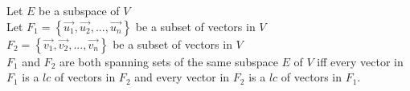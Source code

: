 \documentclass[12pt]{article}
\renewcommand{\v}[1]{\overrightarrow{#1}}
\newcommand{\bb}[1]{\left\{#1\right\}}
\begin{document}
	
	Let $E$ be a subspace of $V$ \\
	Let $F_1 = \bb{\v{u_1}, \v{u_2}, ..., \v{u_n}}$ be a subset of vectors in $V$ \\
	$F_2 = \bb{\v{v_1}, \v{v_2}, ..., \v{v_n}}$ be a subset of vectors in $V$ \\
	$F_1$ and $F_2$ are both spanning sets of the same subspace $E$ of $V$ iff every vector in $F_1$ is a $lc$ of vectors in $F_2$ and every vector in $F_2$ is a $lc$ of vectors in $F_1$.
	
\end{document}
